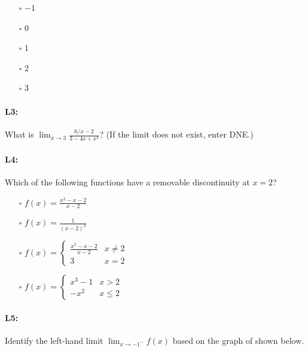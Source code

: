 \documentclass[pdftex, brazil, 12pt, twoside]{article}
\begin{document}
\begin{itemize}[noitemsep]
\item[$\square$] $-1$
\item[$\square$] $0$
\item[$\square$] $1$
\item[$\square$] $2$
\item[$\square$] $3$
\end{itemize}

\paragraph{L3:} What is $\displaystyle \lim_{x \to 3} \frac{6/x - 2}{3 -4x + x^2}$? (If the limit does not exist, enter DNE.)

\paragraph{L4:} Which of the following functions have a removable discontinuity at $x=2$?

\begin{itemize}
\item[$\square$] $f(x) = \frac{x^2 - x - 2}{x - 2}$
\item[$\square$] $f(x) = \frac{1}{(x-2)^2}$
\item[$\square$] $f(x) = \begin{cases}
      \frac{x^2 - x - 2}{x-2} & x \ne 2\\
      3                       & x = 2
    \end{cases}$
\item[$\square$] $f(x) = \begin{cases}
      x^3 - 1 & x > 2\\
      -x^2    & x \le 2
    \end{cases}$ 
\end{itemize}

\paragraph{L5:} Identify the left-hand limit $\displaystyle \lim_{x \to -1^-} f(x)$ based on the graph of shown below.

\begin{figure}[H]
  \begin{center}
    \label{fig:adv-l5}
  \end{center}
\end{figure}
\end{document}
